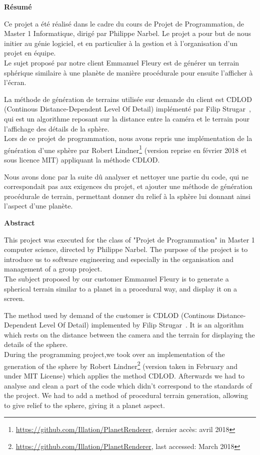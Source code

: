 {\Large
\begin{center}
    \textbf{Résumé}
\end{center}
}

Ce projet a été réalisé dans le cadre du cours de Projet de Programmation, de Master 1 Informatique, dirigé par Philippe Narbel. Le projet a pour but de nous initier au génie logiciel, et en particulier à la gestion et à l'organisation d'un projet en équipe.\\

Le sujet proposé par notre client Emmanuel Fleury est de générer un terrain sphérique similaire à une planète de manière procédurale pour ensuite l'afficher à l'écran. 

La méthode de génération de terrains utilisée sur demande du client est CDLOD (Continous Distance-Dependent Level Of Detail) implémenté par Filip Strugar~\cite{CDLOD}, qui est un algorithme reposant sur la distance entre la caméra et le terrain pour l'affichage des détails de la sphère.\\

Lors de ce projet de programmation, nous avons repris une implémentation de la génération d'une sphère par Robert Lindner\footnote{\url{https://github.com/Illation/PlanetRenderer}, dernier accès: avril 2018} (version reprise en février 2018 et sous licence MIT) appliquant la méthode CDLOD.

Nous avons donc par la suite dû analyser et nettoyer une partie du code, qui ne correspondait pas aux exigences du projet, et ajouter une méthode de génération procédurale de terrain, permettant donner du relief à la sphère lui donnant ainsi l'aspect d'une planète. 

{\Large
\begin{center}
    \textbf{Abstract}
\end{center}
}

This project was executed for the class of "Projet de Programmation" in Master 1 computer science, directed by Philippe Narbel. The purpose of the project is to introduce us to software engineering and especially in the organisation and management of a group project.\\

The subject proposed by our customer Emmanuel Fleury is to generate a spherical terrain similar to a planet in a procedural way, and display it on a screen.

The method used by demand of the customer is CDLOD (Continous Distance-Dependent Level Of Detail) implemented by Filip Strugar~\cite{CDLOD}. It is an algorithm which rests on the distance between the camera and the terrain for displaying the details of the sphere.\\

During the programming project,we took over an implementation of the generation of the sphere by Robert Lindner\footnote{\url{https://github.com/Illation/PlanetRenderer}, last accessed: March 2018} (version taken in February and under MIT License) which applies the method CDLOD.
Afterwards we had to analyse and clean a part of the code which didn't correspond to the standards of the project. We had to add a method of procedural terrain generation, allowing to give relief to the sphere, giving it a planet aspect.
